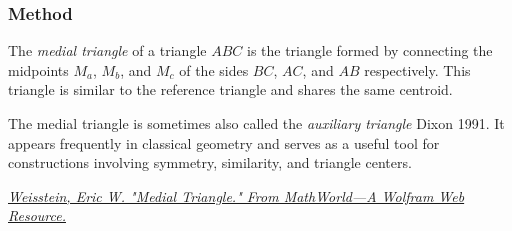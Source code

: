 \subsubsection{Method } %
\label{ssub:method_triangle_medial}

The \emph{medial triangle} of a triangle $ABC$ is the triangle formed by connecting the midpoints $M_a$, $M_b$, and $M_c$ of the sides $BC$, $AC$, and $AB$ respectively. This triangle is similar to the reference triangle and shares the same centroid.

The medial triangle is sometimes also called the \emph{auxiliary triangle} Dixon 1991. It appears frequently in classical geometry and serves as a useful tool for constructions involving symmetry, similarity, and triangle centers.
\begin{flushright}
  \small
\href{https://mathworld.wolfram.com/MedialTriangle.html}
{\textit{Weisstein, Eric W. "Medial Triangle." From MathWorld—A Wolfram Web Resource.}}
\end{flushright}

\vspace{1em}

\vspace{1em}
\begin{minipage}{.5\textwidth}
\begin{center}
  \end{center}
\end{minipage}
\begin{minipage}{.5\textwidth}
\begin{tkzexample}
\end{tkzexample}
\end{minipage}

